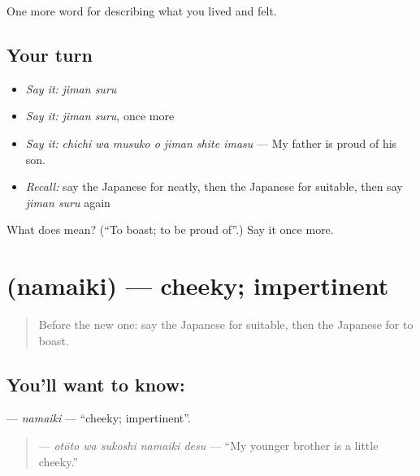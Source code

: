 \begin{grammarlens}[title={What you've built}]
One more word for describing what you lived and felt.
\end{grammarlens}

\subsection*{Your turn}
\begin{itemize}
\raggedright
  \item \emph{Say it:} \emph{jiman suru}
  \item \emph{Say it:} \emph{jiman suru}, once more
  \item \emph{Say it:} \emph{chichi wa musuko o jiman shite imasu} — My father is proud of his son.
  \item \emph{Recall:} say the Japanese for neatly, then the Japanese for suitable, then say \emph{jiman suru} again
\end{itemize}

\begin{tcolorbox}[breakable,colback=teal!4,colframe=teal!35!black,title={Before you move on}]
What does  mean? (\textquotedblleft{}To boast; to be proud of\textquotedblright{}.) Say it once more.
\end{tcolorbox}
\section[\texorpdfstring{\ja{なまいき} (namaiki)}{なまいき (namaiki)}]{ (namaiki) — cheeky; impertinent}

\label{lesson:JA-C441-namaiki}



\begin{quote}
Before the new one: say the Japanese for suitable, then the Japanese for to boast.
\end{quote}

\subsection*{You'll want to know: }
\textbf{} — \emph{namaiki} — \textquotedblleft{}cheeky; impertinent\textquotedblright{}.

\begin{quote}
\textbf{  } — \emph{otōto wa sukoshi namaiki desu} — \textquotedblleft{}My younger brother is a little cheeky.\textquotedblright{}
\end{quote}

